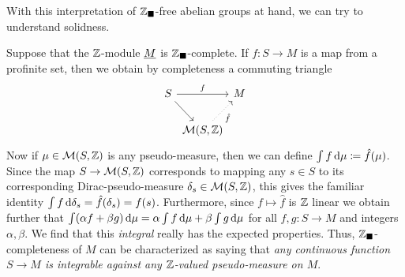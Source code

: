 With this interpretation of ${\mathbb{Z}}_\blacksquare$-free abelian groups at hand, we can try to understand solidness.
\begin{remark}
	\label{remark: interpreting Zblack-completeness}
	
	Suppose that the ${\mathbb{Z}}$-module $\underline{M}$ is ${\mathbb{Z}}_\blacksquare$-complete. If $f\colon S\to M$ is a map from a profinite set, then we obtain by completeness a commuting triangle
	$$\begin{tikzcd}[column sep=1pt]
		S\ar[rr, "f"]\ar[dr] &&M\\
		&\measures{S}{\Z}\ar[ur, "\hat f", dotted, swap]
	\end{tikzcd}$$
	Now if $\mu\in {\mathcal{M}(S, {\mathbb{Z}})}$ is any pseudo-measure, then we can define $\int f\,\mathrm{d} \mu\coloneqq \hat f(\mu)$. Since the map $S\to{\mathcal{M}(S, {\mathbb{Z}})}$ corresponds to mapping any $s \in S$ to its corresponding Dirac-pseudo-measure $\delta_s \in {\mathcal{M}(S, {\mathbb{Z}})}$, this gives the familiar identity $\int f \,\mathrm{d}\delta_s = \hat f(\delta_s) = f(s)$. Furthermore, since $f\mapsto \hat f$ is ${\mathbb{Z}}$ linear we obtain further that $\int (\alpha f + \beta g) \,\mathrm{d}\mu = \alpha \int f\,\mathrm{d}\mu + \beta \int g\,\mathrm{d}\mu$ for all $f, g\colon S\to M$ and integers $\alpha, \beta$. We find that this \emph{integral} really has the expected properties. Thus, ${\mathbb{Z}}_\blacksquare$-completeness of $M$ can be characterized as saying that \emph{any continuous function $S\to M$ is integrable against any ${\mathbb{Z}}$-valued pseudo-measure on $M$}.
	
	

\end{remark}
